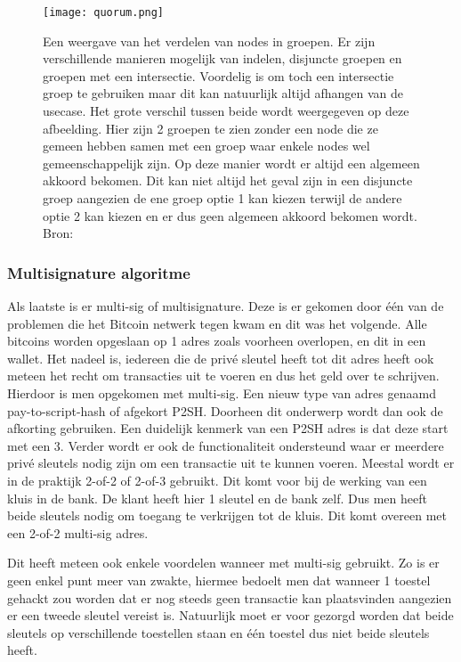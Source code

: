 \begin{figure}
	\texttt{[image: quorum.png]}
	\caption{Een weergave van het verdelen van nodes in groepen. Er zijn verschillende manieren mogelijk van indelen, disjuncte groepen en groepen met een intersectie. Voordelig is om toch een intersectie groep te gebruiken maar dit kan natuurlijk altijd afhangen van de usecase. Het grote verschil tussen beide wordt weergegeven op deze afbeelding. Hier zijn  2 groepen te zien zonder een node die ze gemeen hebben samen met een groep waar enkele nodes wel gemeenschappelijk zijn. Op deze manier wordt er altijd een algemeen akkoord bekomen. Dit kan niet altijd het geval zijn in een disjuncte groep aangezien de ene groep optie 1 kan kiezen terwijl de andere optie 2 kan kiezen en er dus geen algemeen akkoord bekomen wordt. Bron: \textcite{Stellar2015}}
	\label{fig:quorum}
\end{figure}

\subsubsection{Multisignature algoritme}
Als laatste is er multi-sig of multisignature. Deze is er gekomen door één van de problemen die het Bitcoin netwerk tegen kwam en dit was het volgende. Alle bitcoins worden opgeslaan op 1 adres zoals voorheen overlopen, en dit in een wallet. Het nadeel is, iedereen die de privé sleutel heeft tot dit adres heeft ook meteen het recht om transacties uit te voeren en dus het geld over te schrijven. Hierdoor is men opgekomen met multi-sig. Een nieuw type van adres genaamd pay-to-script-hash of afgekort P2SH. Doorheen dit onderwerp wordt dan ook de afkorting gebruiken. Een duidelijk kenmerk van een P2SH adres is dat deze start met een 3. Verder wordt er ook de functionaliteit ondersteund waar er meerdere privé sleutels nodig zijn om een transactie uit te kunnen voeren. Meestal wordt er in de praktijk 2-of-2 of 2-of-3 gebruikt. Dit komt voor bij de werking van een kluis in de bank. De klant heeft hier 1 sleutel en de bank zelf. Dus men heeft beide sleutels nodig om toegang te verkrijgen tot de kluis. Dit komt overeen met een 2-of-2 multi-sig adres. 

Dit heeft meteen ook enkele voordelen wanneer met multi-sig gebruikt. Zo is er geen enkel punt meer van zwakte, hiermee bedoelt men dat wanneer 1 toestel gehackt zou worden dat er nog steeds geen transactie kan plaatsvinden aangezien er een tweede sleutel vereist is. Natuurlijk moet er voor gezorgd worden dat beide sleutels op verschillende toestellen staan en één toestel dus niet beide sleutels heeft. 

